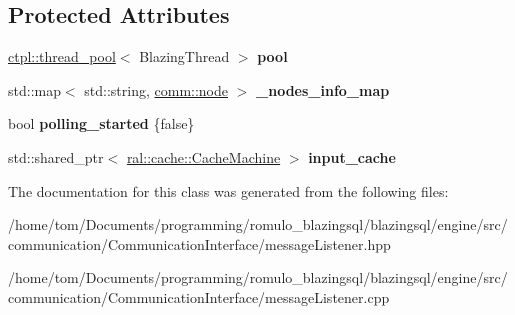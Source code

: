 \subsection*{Protected Attributes}
\begin{DoxyCompactItemize}
\item 
\mbox{\label{classcomm_1_1message__listener_a6e8f1381cd7585997d1f1aee581fcc49}} 
\hyperlink{classctpl_1_1thread__pool}{ctpl\+::thread\+\_\+pool}$<$ Blazing\+Thread $>$ {\bfseries pool}
\item 
\mbox{\label{classcomm_1_1message__listener_a70b3d8a4795e455e5a29c54beeca66cd}} 
std\+::map$<$ std\+::string, \hyperlink{classcomm_1_1node}{comm\+::node} $>$ {\bfseries \+\_\+nodes\+\_\+info\+\_\+map}
\item 
\mbox{\label{classcomm_1_1message__listener_ab8b2a61fd9c0095157ab189b17c81004}} 
bool {\bfseries polling\+\_\+started} \{false\}
\item 
\mbox{\label{classcomm_1_1message__listener_a4a2db537e1dacb6d09316cc8bd275127}} 
std\+::shared\+\_\+ptr$<$ \hyperlink{classral_1_1cache_1_1CacheMachine}{ral\+::cache\+::\+Cache\+Machine} $>$ {\bfseries input\+\_\+cache}
\end{DoxyCompactItemize}


The documentation for this class was generated from the following files\+:\begin{DoxyCompactItemize}
\item 
/home/tom/\+Documents/programming/romulo\+\_\+blazingsql/blazingsql/engine/src/communication/\+Communication\+Interface/message\+Listener.\+hpp\item 
/home/tom/\+Documents/programming/romulo\+\_\+blazingsql/blazingsql/engine/src/communication/\+Communication\+Interface/message\+Listener.\+cpp\end{DoxyCompactItemize}
